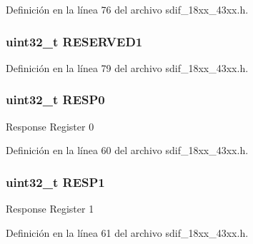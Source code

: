 Definición en la línea 76 del archivo sdif\+\_\+18xx\+\_\+43xx.\+h.

\subsubsection[{\texorpdfstring{R\+E\+S\+E\+R\+V\+E\+D1}{RESERVED1}}]{ uint32\+\_\+t R\+E\+S\+E\+R\+V\+E\+D1}\hypertarget{struct_l_p_c___s_d_m_m_c___t_a39fbdbb7ad559315fa9c23de59936655}{}\label{struct_l_p_c___s_d_m_m_c___t_a39fbdbb7ad559315fa9c23de59936655}


Definición en la línea 79 del archivo sdif\+\_\+18xx\+\_\+43xx.\+h.

\subsubsection[{\texorpdfstring{R\+E\+S\+P0}{RESP0}}]{ uint32\+\_\+t R\+E\+S\+P0}\hypertarget{struct_l_p_c___s_d_m_m_c___t_ad006e907985824c3bad616deb73a97b1}{}\label{struct_l_p_c___s_d_m_m_c___t_ad006e907985824c3bad616deb73a97b1}
Response Register 0 

Definición en la línea 60 del archivo sdif\+\_\+18xx\+\_\+43xx.\+h.

\subsubsection[{\texorpdfstring{R\+E\+S\+P1}{RESP1}}]{ uint32\+\_\+t R\+E\+S\+P1}\hypertarget{struct_l_p_c___s_d_m_m_c___t_a7b0ee0dc541683266dfab6335abca891}{}\label{struct_l_p_c___s_d_m_m_c___t_a7b0ee0dc541683266dfab6335abca891}
Response Register 1 

Definición en la línea 61 del archivo sdif\+\_\+18xx\+\_\+43xx.\+h.

